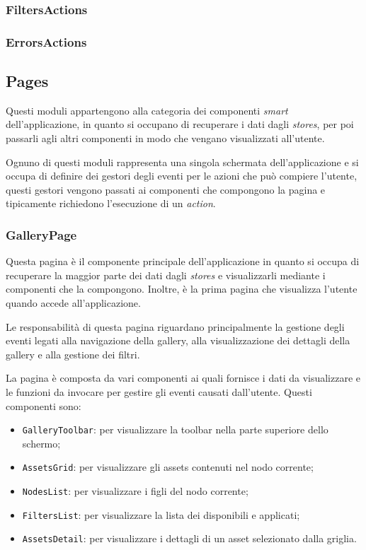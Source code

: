 \subsubsection{FiltersActions}


\subsubsection{ErrorsActions}



\subsection{Pages}

Questi moduli appartengono alla categoria dei componenti \textit{smart} dell'applicazione, in quanto si occupano di recuperare i dati dagli \textit{stores}, per poi passarli agli altri componenti in modo che vengano visualizzati all'utente.

Ognuno di questi moduli rappresenta una singola schermata dell'applicazione e si occupa di definire dei gestori degli eventi per le azioni che può compiere l'utente, questi gestori vengono passati ai componenti che compongono la pagina e tipicamente richiedono l'esecuzione di un \textit{action}.

\subsubsection{GalleryPage}

Questa pagina è il componente principale dell'applicazione in quanto si occupa di recuperare la maggior parte dei dati dagli \textit{stores} e visualizzarli mediante i componenti che la compongono. Inoltre, è la prima pagina che visualizza l'utente quando accede all'applicazione.

Le responsabilità di questa pagina riguardano principalmente la gestione degli eventi legati alla navigazione della gallery, alla visualizzazione dei dettagli della gallery e alla gestione dei filtri.

La pagina è composta da vari componenti ai quali fornisce i dati da visualizzare e le funzioni da invocare per gestire gli eventi causati dall'utente.
Questi componenti sono:
\begin{itemize}
\item \texttt{GalleryToolbar}: per visualizzare la toolbar nella parte superiore dello schermo;
\item \texttt{AssetsGrid}: per visualizzare gli assets contenuti nel nodo corrente;
\item \texttt{NodesList}: per visualizzare i figli del nodo corrente;
\item \texttt{FiltersList}: per visualizzare la lista dei disponibili e applicati;
\item \texttt{AssetsDetail}: per visualizzare i dettagli di un asset selezionato dalla griglia.
\end{itemize}


